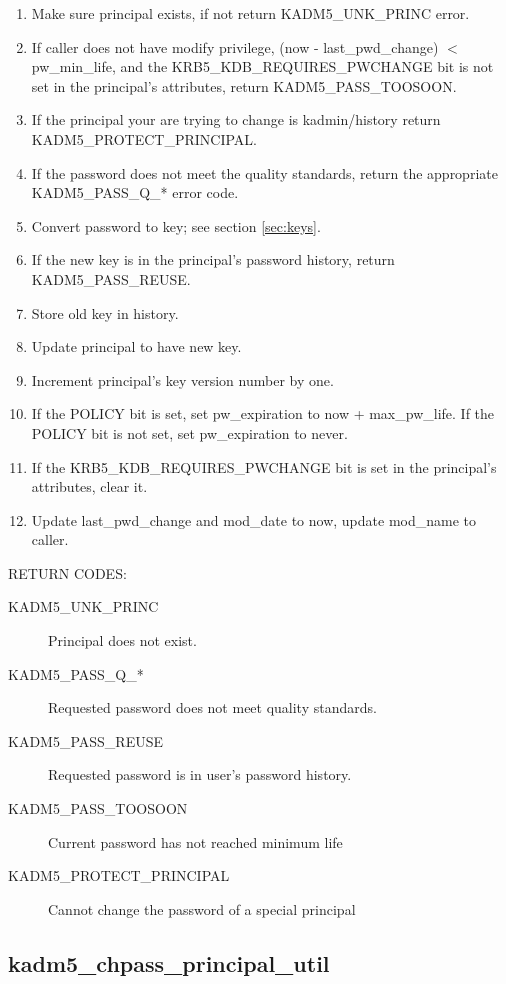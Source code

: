 \begin{enumerate}
\item Make sure principal exists, if not return KADM5_UNK_PRINC error.
\item If caller does not have modify privilege, (now - last_pwd_change) $<$
pw_min_life, and the KRB5_KDB_REQUIRES_PWCHANGE bit is not set in the
principal's attributes, return KADM5_PASS_TOOSOON.
\item If the principal your are trying to change is kadmin/history
return KADM5_PROTECT_PRINCIPAL.
\item If the password does not meet the quality
standards, return the appropriate KADM5_PASS_Q_* error code.
\item Convert password to key; see section \ref{sec:keys}.
\item If the new key is in the principal's password history, return
KADM5_PASS_REUSE.
\item Store old key in history.
\item Update principal to have new key.
\item Increment principal's key version number by one.
\item If the POLICY bit is set, set pw_expiration to now +
max_pw_life.  If the POLICY bit is not set, set pw_expiration to
never.
\item If the KRB5_KDB_REQUIRES_PWCHANGE bit is set in the principal's
attributes, clear it.
\item Update last_pwd_change and mod_date to now, update mod_name to
caller.
\end{enumerate}

RETURN CODES:

\begin{description}
\item[KADM5_UNK_PRINC] Principal does not exist.
\item[KADM5_PASS_Q_*] Requested password does not meet quality
standards.
\item[KADM5_PASS_REUSE] Requested password is in user's
password history.
\item[KADM5_PASS_TOOSOON] Current password has not reached minimum life
\item[KADM5_PROTECT_PRINCIPAL] Cannot change the password of a special principal
\end{description}


\subsection{kadm5_chpass_principal_util}

